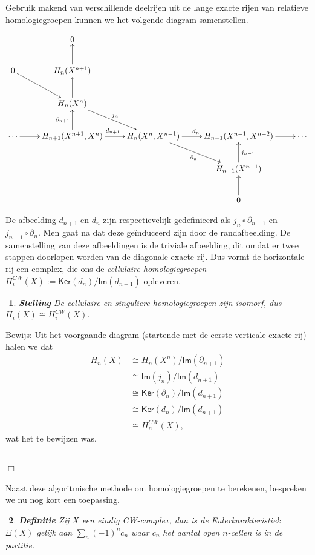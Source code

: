 \documentclass[12pt]{book}
\newcommand{\bew}{{\sc Bewijs: }}
\newcommand{\B}{\rule{1mm}{0mm} \hfill $\Box$ }
\newtheorem{stelh}{$\!\!$}[section]
\newenvironment{stel}{\begin{stelh}{\em {\bf Stelling }}}{\end{stelh}}
\newtheorem{dfh}[stelh]{$\!\!$}
\newenvironment{df}{\begin{dfh} \em {\bf Definitie }}{\end{dfh}}
\begin{document}
Gebruik makend van verschillende deelrijen uit de lange exacte rijen van relatieve  homologiegroepen kunnen we het volgende diagram samenstellen.


$$
 \xymatrix{ 
 &  0 \\
  0 \ar[dr]  &  H_ n(X^{n+1}) \ar[u]  \\
 &  H_n(X^n) \ar[u]  \ar[dr]^{j_n} \\
  \cdots \ar[r] & H_{n+1}(X^{n+1},X^n) \ar[r]^{d_{n+1}}\ar[u]^{\partial_{n+1}} & H_n(X^n,X^{n-1})  \ar[dr]_{\partial_n}  \ar[r]^{d_{n}} &  H_{n-1}(X^{n-1},X^{n-2})   \ar[r] & \cdots \\
 & & & H_{n-1}(X^{n-1}) \ar[u]_{j_{n-1}} \\
 & & & 0 \ar[u]
}
$$

De afbeelding $d_{n+1}$ en $d_n$ zijn respectievelijk gedefinieerd als $j_n \circ \partial_{n+1}$ en $j_{n-1} \circ \partial_{n}$. Men gaat na dat deze ge\"induceerd zijn door de randafbeelding. De samenstelling van deze afbeeldingen is de triviale afbeelding, dit omdat er twee stappen doorlopen worden van de diagonale exacte rij. Dus vormt de horizontale rij een complex, die ons de \emph{cellulaire homologiegroepen} $H_i^{CW}(X) := \mathsf{Ker}(d_{n} ) / \mathsf{Im}(d_{n+1} )    $ opleveren.

\begin{stel}
De cellulaire en singuliere homologiegroepen zijn isomorf, dus $H_i(X) \cong H_i^{CW}(X)$.
\end{stel}
\bew
Uit het voorgaande diagram (startende met de eerste verticale exacte rij) halen we dat 
\begin{align*}
H_n(X) &\cong H_n(X^n) / \mathsf{Im}(\partial_{n+1}) \\
& \cong  \mathsf{Im}(j_n)  /  \mathsf{Im}(d_{n+1}) \\
& \cong \mathsf{Ker}(\partial_n) /  \mathsf{Im}(d_{n+1}) \\
& \cong \mathsf{Ker}(d_n) /  \mathsf{Im}(d_{n+1})  \\
& \cong H_n^{CW}(X),
\end{align*}
wat het te bewijzen was.
\B
\bigskip

Naast deze algoritmische methode om homologiegroepen te berekenen, bespreken we nu nog kort een toepassing. 

\begin{df}
Zij $X$ een eindig CW-complex, dan is de \emph{Eulerkarakteristiek} $\Xi(X)$ gelijk aan $\sum_n (-1)^n c_n$ waar $c_n$ het aantal open $n$-cellen is in de partitie.
\end{df}
\end{document}
